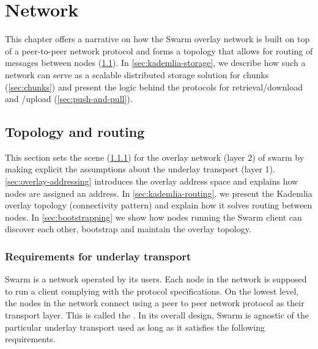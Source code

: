 \chapter{Network}\label{sec:network}

This chapter offers a narrative on how the Swarm overlay network is built on top of a peer-to-peer network protocol and forms a topology that  allows for routing of messages between nodes (\ref{sec:topology-routing}). In \ref{sec:kademlia-storage}, we describe how such a network can serve as a scalable distributed storage solution for chunks (\ref{sec:chunks}) and present the logic behind the protocols for retrieval/download and /upload (\ref{sec:push-and-pull}).

\section{Topology and routing}\label{sec:topology-routing}

This section sets the scene (\ref{sec:underlay-transport}) for the overlay network (layer 2) of swarm by making explicit the assumptions about the underlay transport (layer 1). \ref{sec:overlay-addressing} introduces the overlay address space and explains how nodes are assigned an address. In  \ref{sec:kademlia-routing}, we present the Kademlia overlay topology (connectivity  pattern) and explain how it solves routing between nodes. In \ref{sec:bootstrapping} we show how nodes running the Swarm client can discover each other, bootstrap and maintain the overlay topology.

\subsection{Requirements for underlay transport}\label{sec:underlay-transport} 

Swarm is a network operated by its users. Each node in the network is supposed to run a client complying with the protocol specifications. On the lowest level, the nodes in the network connect using a peer to peer network protocol as their transport layer. This is called the . 
In its overall design, Swarm is agnostic of the particular underlay transport used as long as it satisfies the following requirements.

